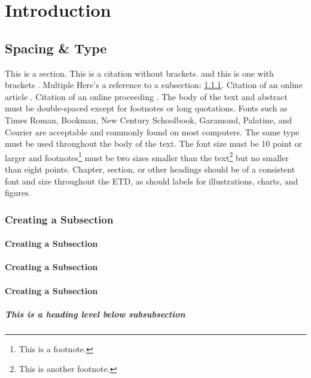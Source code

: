 \usepackage{blindtext}
\usepackage{bm}
\usepackage{amsmath}
\usepackage{graphicx}


\chapter{Introduction}
\label{ch:intro}


\section{Spacing \& Type}
\label{sec:section}

This is a section. This is a citation without brackets. and this is one with brackets \cite{A}. Multiple \cite{A,B,C} Here's a reference to a subsection: \ref{subsec:subsection}. Citation of an online article \cite{D}. Citation of an online proceeding \cite{F}. The body of the text and abstract must be double-spaced except for footnotes or long quotations. Fonts such as Times Roman, Bookman, New Century Schoolbook, Garamond, Palatine, and Courier are acceptable and commonly found on most computers. The same type must be used throughout the body of the text. The font size must be 10 point or larger and footnotes\footnote{This is a footnote.} must be two sizes smaller than the text\footnote{This is another footnote.} but no smaller than eight points. Chapter, section, or other headings should be of a consistent font and size throughout the ETD, as should labels for illustrations, charts, and figures.

\subsection{Creating a Subsection}
\label{subsec:subsection}

\subsubsection{Creating a Subsection}

\subsubsection{Creating a Subsection}

\subsubsection{Creating a Subsection}

\paragraph{This is a heading level below subsubsection}

